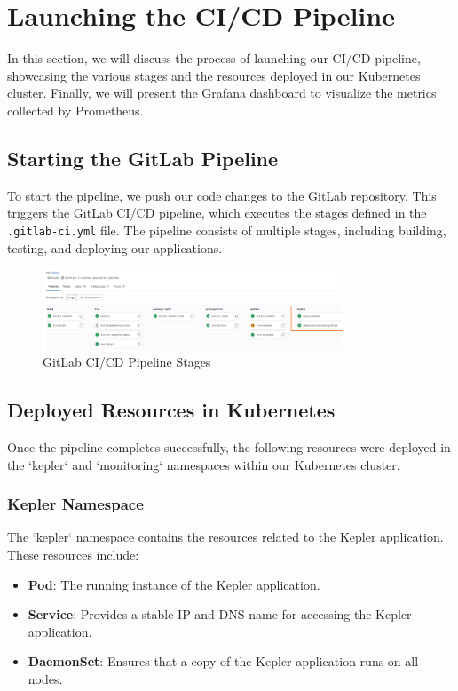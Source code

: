 \section{Launching the CI/CD Pipeline}

In this section, we will discuss the process of launching our CI/CD pipeline, showcasing the various stages and the resources deployed in our Kubernetes cluster. Finally, we will present the Grafana dashboard to visualize the metrics collected by Prometheus.

\subsection{Starting the GitLab Pipeline}

To start the pipeline, we push our code changes to the GitLab repository. This triggers the GitLab CI/CD pipeline, which executes the stages defined in the \texttt{.gitlab-ci.yml} file. The pipeline consists of multiple stages, including building, testing, and deploying our applications.

\begin{figure}[H]
  \centering
  \includegraphics[width=0.8\textwidth]{Figures/gitlab-pipeline.png}
  \caption{GitLab CI/CD Pipeline Stages}
\end{figure}

\subsection{Deployed Resources in Kubernetes}

Once the pipeline completes successfully, the following resources were deployed in the `kepler` and `monitoring` namespaces within our Kubernetes cluster.

\subsubsection{Kepler Namespace}

The `kepler` namespace contains the resources related to the Kepler application. These resources include:

\begin{itemize}
    \item \textbf{Pod}: The running instance of the Kepler application.
    \item \textbf{Service}: Provides a stable IP and DNS name for accessing the Kepler application.
    \item \textbf{DaemonSet}: Ensures that a copy of the Kepler application runs on all nodes.
\end{itemize}

